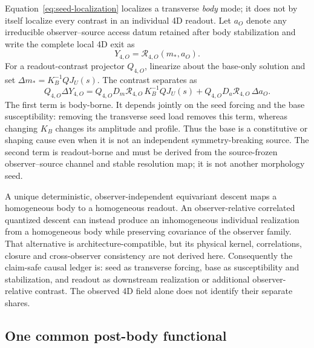 \documentclass[11pt]{article}
\begin{document}
Equation~\eqref{eq:seed-localization} localizes a transverse \emph{body}
mode; it does not by itself localize every contrast in an individual 4D
readout. Let $a_O$ denote any irreducible observer--source access datum
retained after body stabilization and write the complete local 4D exit as
\begin{equation}
 Y_{4,O}=\mathcal R_{4,O}(m_*,a_O).
 \label{eq:four-d-readout-map}
\end{equation}
For a readout-contrast projector $Q_{4,O}$, linearize about the base-only
solution and set $\Delta m_*=K_B^{-1}QJ_U(s)$. The contrast separates as
\begin{equation}
 \boxed{
 Q_{4,O}\Delta Y_{4,O}
 =Q_{4,O}D_m\mathcal R_{4,O}\,K_B^{-1}QJ_U(s)
 +Q_{4,O}D_a\mathcal R_{4,O}\,\Delta a_O.}
 \label{eq:four-d-inhomogeneity-ledger}
\end{equation}
The first term is body-borne. It depends jointly on the seed forcing and the
base susceptibility: removing the transverse seed load removes this term,
whereas changing $K_B$ changes its amplitude and profile. Thus the base is a
constitutive or shaping cause even when it is not an independent
symmetry-breaking source. The second term is readout-borne and must be
derived from the source-frozen observer--source channel and stable resolution
map; it is not another morphology seed.

A unique deterministic, observer-independent equivariant descent maps a
homogeneous body to a homogeneous readout. An observer-relative correlated
quantized descent can instead produce an inhomogeneous individual realization
from a homogeneous body while preserving covariance of the observer family.
That alternative is architecture-compatible, but its physical kernel,
correlations, closure and cross-observer consistency are not derived here.
Consequently the claim-safe causal ledger is: seed as transverse forcing,
base as susceptibility and stabilization, and readout as downstream
realization or additional observer-relative contrast. The observed 4D field
alone does not identify their separate shares.

\subsection{One common post-body functional}
\end{document}
